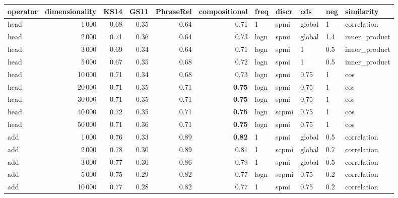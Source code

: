 \begin{tabular}{lrrrrrlllll}
\toprule
operator &  dimensionality &  KS14 &  GS11 &  PhraseRel &  compositional &  freq &  discr &     cds &  neg &     similarity \\
\midrule
    head &            1\,000 &  0.68 &  0.35 &       0.64 &           0.71 &     1 &   spmi &  global &    1 &    correlation \\
    head &            2\,000 &  0.71 &  0.36 &       0.64 &           0.73 &  logn &   spmi &  global &  1.4 &  inner\_product \\
    head &            3\,000 &  0.69 &  0.34 &       0.64 &           0.71 &  logn &   spmi &       1 &  0.5 &  inner\_product \\
    head &            5\,000 &  0.67 &  0.35 &       0.68 &           0.72 &  logn &   spmi &       1 &  0.5 &  inner\_product \\
    head &           10\,000 &  0.71 &  0.34 &       0.68 &           0.73 &  logn &   spmi &    0.75 &    1 &            cos \\
    head &           20\,000 &  0.71 &  0.35 &       0.71 &           \textbf{0.75} &  logn &   spmi &    0.75 &    1 &            cos \\
    head &           30\,000 &  0.71 &  0.35 &       0.71 &           \textbf{0.75} &  logn &   spmi &    0.75 &    1 &            cos \\
    head &           40\,000 &  0.72 &  0.35 &       0.71 &           \textbf{0.75} &  logn &  scpmi &    0.75 &    1 &            cos \\
    head &           50\,000 &  0.71 &  0.36 &       0.71 &           \textbf{0.75} &  logn &   spmi &    0.75 &    1 &            cos \\ \addlinespace
     add &            1\,000 &  0.76 &  0.33 &       0.89 &           \textbf{0.82} &     1 &   spmi &  global &  0.5 &    correlation \\
     add &            2\,000 &  0.78 &  0.30 &       0.89 &           0.81 &     1 &  scpmi &  global &  0.7 &    correlation \\
     add &            3\,000 &  0.77 &  0.30 &       0.86 &           0.79 &     1 &   spmi &  global &  0.5 &    correlation \\
     add &            5\,000 &  0.75 &  0.29 &       0.82 &           0.77 &  logn &  scpmi &    0.75 &  0.2 &    correlation \\
     add &           10\,000 &  0.77 &  0.28 &       0.82 &           0.77 &     1 &   spmi &    0.75 &  0.2 &    correlation \\

\end{tabular}
